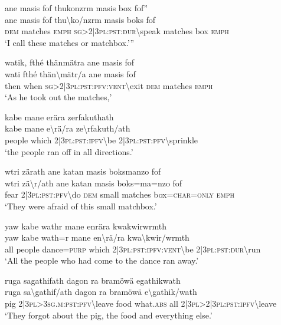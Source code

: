 \ea\label{ex:11:a2543}
ane masis fof thukonzrm masis box fof''\\
\gll ane	masis	fof	thu{\textbackslash}ko/nzrm	masis	boks	fof\\
     \textsc{dem}	matches	\textsc{emph}	\textsc{sg}>2|3\textsc{pl}:\textsc{pst}:\textsc{dur}{\textbackslash}speak	matches	box	\textsc{emph}\\
\glt `I call these matches or matchbox.'''
\z

\ea\label{ex:11:a2545}
watik, fthé thänmätra ane masis fof\\
\gll wati	fthé	thän{\textbackslash}mätr/a	ane	masis	fof\\
     then	when	\textsc{sg}>2|3\textsc{pl}:\textsc{pst}:\textsc{pfv}:\textsc{vent}{\textbackslash}exit	\textsc{dem}	matches	\textsc{emph}\\
\glt `As he took out the matches,'
\z

\ea\label{ex:11:a2546}
kabe mane erära zerfakuthath\\
\gll kabe	mane	e{\textbackslash}rä/ra	ze{\textbackslash}rfakuth/ath\\
     people	which	2|3\textsc{pl}:\textsc{pst}:\textsc{ipfv}{\textbackslash}be	2|3\textsc{pl}:\textsc{pst}:\textsc{pfv}{\textbackslash}sprinkle\\
\glt `the people ran off in all directions.'
\z

\ea\label{ex:11:a2547}
wtri zärath ane katan masis boksmanzo fof\\
\gll wtri	zä{\textbackslash}r/ath	ane	katan	masis	boks=ma=nzo	fof\\
     fear	2|3\textsc{pl}:\textsc{pst}:\textsc{pfv}{\textbackslash}do	\textsc{dem}	small	matches	box=\textsc{char}=\textsc{only}	\textsc{emph}\\
\glt `They were afraid of this small matchbox.'
\z

\ea\label{ex:11:a2548}
yaw kabe wathr mane enrära kwakwirwrmth\\
\gll yaw	kabe	wath=r	mane	en{\textbackslash}rä/ra	kwa{\textbackslash}kwir/wrmth\\
     all	people	dance=\textsc{purp}	which	2|3\textsc{pl}:\textsc{pst}:\textsc{ipfv}:\textsc{vent}{\textbackslash}be	2|3\textsc{pl}:\textsc{pst}:\textsc{dur}{\textbackslash}run\\
\glt `All the people who had come to the dance ran away.'
\z

\ea\label{ex:11:a2549}
ruga sagathifath dagon ra bramöwä egathikwath\\
\gll ruga	sa{\textbackslash}gathif/ath	dagon	ra	bramöwä	e{\textbackslash}gathik/wath\\
     pig	2|3\textsc{pl}>3\textsc{sg}.\textsc{m}:\textsc{pst}:\textsc{pfv}{\textbackslash}leave	food	what.\textsc{abs}	all	2|3\textsc{pl}>2|3\textsc{pl}:\textsc{pst}:\textsc{ipfv}{\textbackslash}leave\\
\glt `They forgot about the pig, the food and everything else.'
\z

